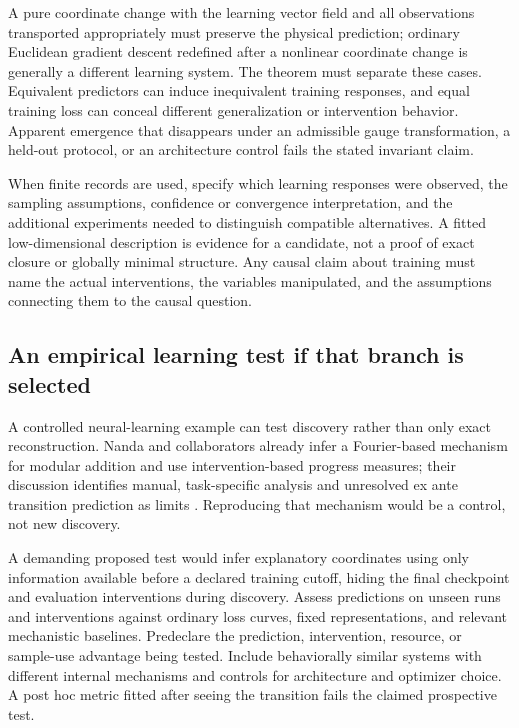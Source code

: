 \documentclass[11pt]{article}
\theoremstyle{remark}
\begin{document}
A pure coordinate change with the learning vector field and all observations transported appropriately must preserve the physical prediction; ordinary Euclidean gradient descent redefined after a nonlinear coordinate change is generally a different learning system. The theorem must separate these cases. Equivalent predictors can induce inequivalent training responses, and equal training loss can conceal different generalization or intervention behavior. Apparent emergence that disappears under an admissible gauge transformation, a held-out protocol, or an architecture control fails the stated invariant claim.

When finite records are used, specify which learning responses were observed, the sampling assumptions, confidence or convergence interpretation, and the additional experiments needed to distinguish compatible alternatives. A fitted low-dimensional description is evidence for a candidate, not a proof of exact closure or globally minimal structure. Any causal claim about training must name the actual interventions, the variables manipulated, and the assumptions connecting them to the causal question.

\subsection{An empirical learning test if that branch is selected}

A controlled neural-learning example can test discovery rather than only exact reconstruction. Nanda and collaborators already infer a Fourier-based mechanism for modular addition and use intervention-based progress measures; their discussion identifies manual, task-specific analysis and unresolved ex ante transition prediction as limits \cite{Grokking}. Reproducing that mechanism would be a control, not new discovery.

A demanding proposed test would infer explanatory coordinates using only information available before a declared training cutoff, hiding the final checkpoint and evaluation interventions during discovery. Assess predictions on unseen runs and interventions against ordinary loss curves, fixed representations, and relevant mechanistic baselines. Predeclare the prediction, intervention, resource, or sample-use advantage being tested. Include behaviorally similar systems with different internal mechanisms and controls for architecture and optimizer choice. A post hoc metric fitted after seeing the transition fails the claimed prospective test.
\end{document}
